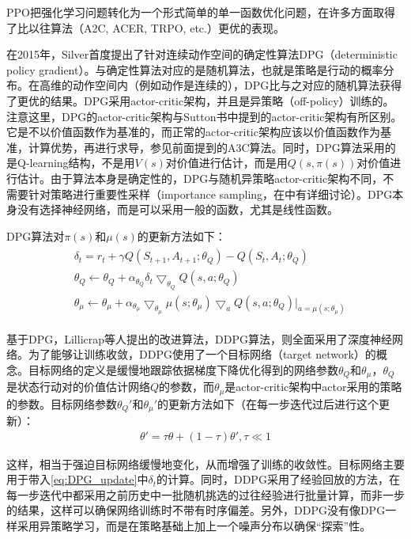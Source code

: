 \documentclass[degree=bachelor, tocarialchapter, pifootnote]{thuthesis}
\begin{document}
      \par PPO把强化学习问题转化为一个形式简单的单一函数优化问题，在许多方面取得了比以往算法（A2C, ACER, TRPO, etc.）更优的表现。\par
      在2015年，Silver首度提出了针对连续动作空间的确定性算法DPG（deterministic policy gradient）\cite{DPG}。与确定性算法对应的是随机算法，也就是策略是行动的概率分布。在高维的动作空间内（例如动作是连续的），DPG比与之对应的随机算法获得了更优的结果。DPG采用actor-critic架构，并且是异策略（off-policy）训练的。注意这里，DPG的actor-critic架构与Sutton书中提到的actor-critic架构有所区别。它是不以价值函数作为基准的，而正常的actor-critic架构应该以价值函数作为基准，计算优势，再进行求导\cite{Sutton_book}，参见前面提到的A3C算法\cite{A3C}。同时，DPG算法采用的是Q-learning结构，不是用$V(s)$对价值进行估计，而是用$Q(s, \pi(s))$对价值进行估计。由于算法本身是确定性的，DPG与随机异策略actor-critic架构\cite{off-policy_actor-critic}不同，不需要针对策略进行重要性采样（importance sampling，在\cite{Sutton_book}中有详细讨论）。DPG本身没有选择神经网络，而是可以采用一般的函数，尤其是线性函数。\par
      DPG算法对$\pi(s)$和$\mu(s)$的更新方法如下：
      \begin{align}
        \begin{aligned}
          &\delta_t = r_t + \gamma Q(S_{t+1}, A_{t+1};\theta_Q) - Q(S_t, A_t;\theta_Q)\\
          &\theta_Q \gets \theta_Q + \alpha_{\theta_Q}\delta_t \bigtriangledown_{\theta_Q}Q(s, a;\theta_Q)\\
          &\theta_\mu \gets \theta_\mu + \alpha_{\theta_\mu}\bigtriangledown_{\theta_\mu}\mu(s;\theta_\mu)\bigtriangledown_{a}Q(s, a;\theta_Q)|_{a = \mu(s;\theta_\mu)}
        \end{aligned}
        \label{eq:DPG_update}
      \end{align}
      \par 基于DPG，Lillicrap等人提出的改进算法，DDPG算法\cite{DDPG}，则全面采用了深度神经网络。为了能够让训练收敛，DDPG使用了一个目标网络（target network）的概念。目标网络的定义是缓慢地跟踪依据梯度下降优化得到的网络参数$\theta_Q$和$\theta_\mu$，$\theta_Q$是状态行动对的价值估计网络$Q$的参数，而$\theta_\mu$是actor-critic架构中actor采用的策略的参数。目标网络参数$\theta_Q'$和$\theta_\mu'$的更新方法如下（在每一步迭代过后进行这个更新）：
      \begin{align*}
        \theta' = \tau \theta + (1-\tau) \theta', \tau \ll 1
        \label{eq:target_network}
      \end{align*}
      \par 这样，相当于强迫目标网络缓慢地变化，从而增强了训练的收敛性。目标网络主要用于带入\eqref{eq:DPG_update}中$\delta_t$的计算。同时，DDPG采用了经验回放的方法，在每一步迭代中都采用之前历史中一批随机挑选的过往经验进行批量计算，而非一步的结果，这样可以确保网络训练时不带有时序偏差。另外，DDPG没有像DPG一样采用异策略学习，而是在策略基础上加上一个噪声分布以确保``探索''性。\par
    
\end{document}
